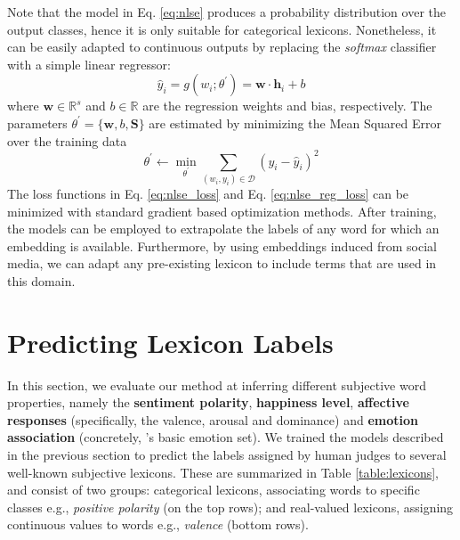 \documentclass[letterpaper]{article}
\newcommand{\newcite}[1]{\citeauthor{#1} \shortcite{#1}}
\begin{document}
Note that the model in Eq. \ref{eq:nlse} produces a probability distribution over the output classes, hence it is only suitable for categorical lexicons. Nonetheless, it can be easily adapted to continuous outputs by replacing the \textit{softmax} classifier with a simple linear regressor:
\begin{equation}
\hat{y}_{i} = g(w_i;\theta^{\prime}) = \mathbf{w} \cdot \mathbf{h}_i + b
\label{eq:nlse_reg}
\end{equation}
\noindent where $\mathbf{w} \in \mathbb{R}^s$ and $b \in \mathbb{R}$ are the regression weights and bias, respectively. The parameters $\theta^{\prime}=\{\mathbf{w},b,\mathbf{S}\}$ are estimated by minimizing the Mean Squared Error over the training data
\begin{equation}
\theta^{\prime} \leftarrow \underset{\theta^{\prime}}{\min} \sum_{(w_i,y_i) \in \mathcal{D}} (y_i-\hat{y}_i)^2
\label{eq:nlse_reg_loss}
\end{equation}
\noindent The loss functions in Eq. \ref{eq:nlse_loss} and Eq. \ref{eq:nlse_reg_loss} can be minimized with standard gradient based optimization methods. After training, the models can be employed to extrapolate the labels of any word for which an embedding is available. Furthermore, by using embeddings induced from social media, we can adapt any pre-existing lexicon to include terms that are used in this domain. 


\section{Predicting Lexicon Labels}

In this section, we evaluate our method at inferring different subjective word properties, namely the \textbf{sentiment polarity}, \textbf{happiness level}, \textbf{affective responses} (specifically, the valence, arousal and dominance) and \textbf{emotion association} (concretely, \newcite{Plutchik}'s basic emotion set). We trained the models described in the previous section to predict the labels assigned by human judges to several well-known subjective lexicons. These are summarized in Table \ref{table:lexicons}, and consist of two groups: categorical lexicons, associating words to specific classes e.g., \textit{positive polarity} (on the top rows); and real-valued lexicons, assigning continuous values to words e.g., \textit{valence} (bottom rows). 
\end{document}
